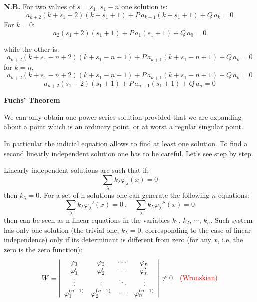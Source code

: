 \documentclass{article}
\begin{document}
\vspace{2mm}\noindent
\textbf{N.B.} For two values of $s = s_1,\, s_1 - n$ one solution is:
\begin{equation}
    a_{k+2} (k + s_1 + 2)(k + s_1 + 1) + P\, a_{k+1} (k + s_1 + 1) + Q\, a_k = 0
\end{equation}
For $k=0$:
\begin{equation}
    a_2 (s_1 + 2)(s_1 + 1) + P\, a_1 (s_1 + 1) + Q\, a_0 = 0
\end{equation}

\newpage
\noindent
while the other is:
\begin{equation}
    a_{k+2} (k + s_1 - n + 2)(k + s_1 - n + 1) 
+ P\, a_{k+1} (k + s_1 - n + 1) 
+ Q\, a_k = 0
\end{equation}
for $k=n$,
\begin{equation}
    a_{k+2} (k + s_1 - n + 2)(k + s_1 - n + 1) + P\, a_{k+1} (k + s_1 - n + 1) + Q\, a_k = 0
\end{equation}
\begin{equation}
    a_{n+2} (s_1 + 2)(s_1 + 1) + P\, a_{n+1} (s_1 + 1) + Q\, a_n = 0
\end{equation}

\vspace{3mm}\noindent
\textbf{Fuchs' Theorem}

\noindent We can only obtain one power-series solution provided that we are expanding about a point which is 
an ordinary point, or at worst a regular singular point. 

\vspace{3mm}\noindent
In particular the indicial equation allows to find at least one solution. To find a second linearly independent solution one has to be careful. Let’s see step by step.

\noindent
Linearly independent solutions are such that if:
\begin{equation}
    \sum_{\lambda} k_{\lambda} \varphi_{\lambda}(x) = 0
\end{equation}
then $k_\lambda=0$. For a set of n solutions one can generate the following $n$ equations:
\begin{equation}
    \sum_{\lambda} k_{\lambda} \varphi_{\lambda}'(x) = 0 \ , \quad 
\sum_{\lambda} k_{\lambda} \varphi_{\lambda}''(x) = 0
\end{equation}
then can be seen as n linear equations in the variables $k_1$, $k_2$, $\cdots$, $k_n$. Such system has only one solution (the trivial one, $k_\lambda=0$, corresponding to the case of linear independence) only if its determinant is different from zero (for any $x$, i.e. the zero is the zero function):
\begin{equation}
    W \equiv \left|
\begin{array}{cccc}
\varphi_1 & \varphi_2 & \cdots & \varphi_n \\
\varphi_1' & \varphi_2' & \cdots & \varphi_n' \\
\vdots & \vdots & \ddots & \vdots \\
\varphi_1^{(n-1)} & \varphi_2^{(n-1)} & \cdots & \varphi_n^{(n-1)}
\end{array}
\right| \neq 0 \quad \color{red}{\text{(Wronskian)}} \color{black}
\end{equation}
\end{document}
